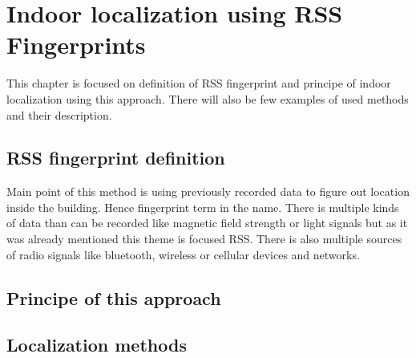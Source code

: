 \chapter{Indoor localization using RSS Fingerprints}\label{sec:Indoor localization using RSS Fingerptints}
This chapter is focused on definition of RSS fingerprint and principe of indoor localization using this approach. There will also be few examples of used methods and their description.

\section{RSS fingerprint definition}\label{sec:RSSFingerprintDefinition}
Main point of this method is using previously recorded data to figure out location inside the building. Hence fingerprint term in the name. There is multiple kinds of data than can be recorded like magnetic field strength or light signals but as it was already mentioned this theme is focused RSS. There is also multiple sources of radio signals like bluetooth, wireless or cellular devices and networks.

\section{Principe of this approach}\label{sec:PrincipeOfThisApproach}

\section{Localization methods}\label{sec:LocalizationMethods}
